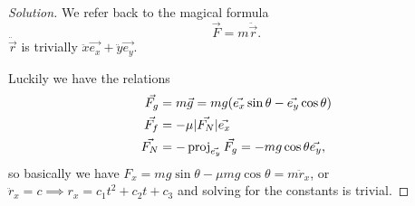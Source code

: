 \begin{proof}[Solution]
We refer back to the magical formula
\[ \vec{F} = m\ddot{\vec{r}}. \]
$\ddot{\vec{r}}$ is trivially $\ddot{x} \vec{e_x} + \ddot{y} \vec{e_y}$.

Luckily we have the relations
\[ \begin{aligned}
\vec{F_g} &= m\vec{g} = mg(\vec{e_x} \sin \theta - \vec{e_y} \cos
\theta) \\
\vec{F_f} &= -\mu |\vec{F_N}| \vec{e_x} \\
\vec{F_N} &= -\operatorname{proj}_{\vec{e_y}} \vec{F_g} = -mg\cos\theta \vec{e_y}, \\
\end{aligned} \]
so basically we have $F_x = mg\sin\theta - \mu mg \cos \theta =
m\ddot{r}_x$, or $\ddot{r}_x = c \implies r_x = c_1 t^2 + c_2 t + c_3$
and solving for the constants is trivial.
\end{proof}
